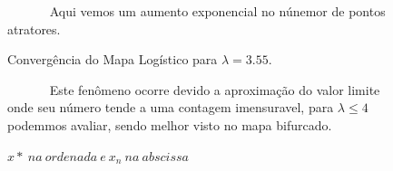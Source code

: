 \documentclass[pdftex,12pt,a4paper]{article}
\begin{document}
\begin{figure}
~~~~~~ Aqui vemos um aumento exponencial no núnemor de pontos atratores. 
\centering
\caption{Convergência do Mapa Logístico para $\lambda = 3.55$.}
\caption*{$x*\ na\ ordenada\ e\ x_{n}\ na\ abscissa$ }
~~~~~~ Este fenômeno ocorre devido a aproximação do valor limite onde seu número tende a uma contagem imensuravel, para $\lambda \leq 4$ podemmos avaliar, sendo melhor visto no mapa bifurcado.
\end{figure}
\end{document}
